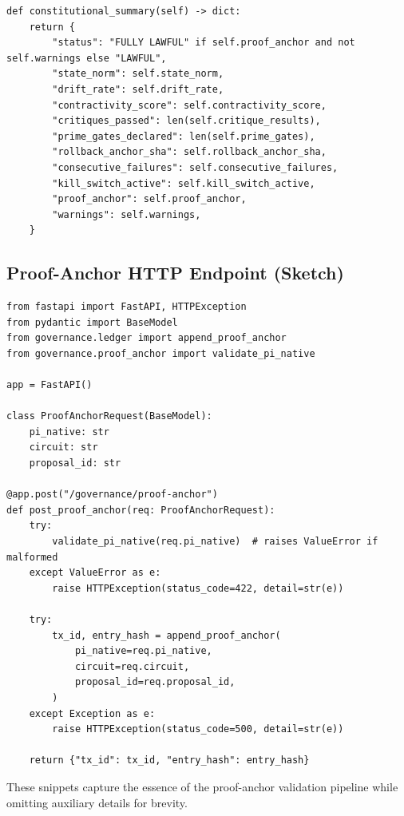 \documentclass[11pt]{article}
\begin{document}
\begin{verbatim}
def constitutional_summary(self) -> dict:
    return {
        "status": "FULLY LAWFUL" if self.proof_anchor and not self.warnings else "LAWFUL",
        "state_norm": self.state_norm,
        "drift_rate": self.drift_rate,
        "contractivity_score": self.contractivity_score,
        "critiques_passed": len(self.critique_results),
        "prime_gates_declared": len(self.prime_gates),
        "rollback_anchor_sha": self.rollback_anchor_sha,
        "consecutive_failures": self.consecutive_failures,
        "kill_switch_active": self.kill_switch_active,
        "proof_anchor": self.proof_anchor,
        "warnings": self.warnings,
    }
\end{verbatim}

\subsection{Proof-Anchor HTTP Endpoint (Sketch)}

\begin{verbatim}
from fastapi import FastAPI, HTTPException
from pydantic import BaseModel
from governance.ledger import append_proof_anchor
from governance.proof_anchor import validate_pi_native

app = FastAPI()

class ProofAnchorRequest(BaseModel):
    pi_native: str
    circuit: str
    proposal_id: str

@app.post("/governance/proof-anchor")
def post_proof_anchor(req: ProofAnchorRequest):
    try:
        validate_pi_native(req.pi_native)  # raises ValueError if malformed
    except ValueError as e:
        raise HTTPException(status_code=422, detail=str(e))

    try:
        tx_id, entry_hash = append_proof_anchor(
            pi_native=req.pi_native,
            circuit=req.circuit,
            proposal_id=req.proposal_id,
        )
    except Exception as e:
        raise HTTPException(status_code=500, detail=str(e))

    return {"tx_id": tx_id, "entry_hash": entry_hash}
\end{verbatim}

These snippets capture the essence of the proof-anchor validation pipeline while omitting auxiliary details for brevity.

\end{document}
